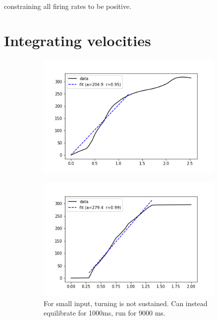 \documentclass{article}
\begin{document}
constraining all firing rates to be positive.



\section{Integrating velocities}


\begin{figure}[h]
	\centering
	\begin{subfigure}[t]{0.43\linewidth}
		\centering
		\includegraphics[width = 1.0\linewidth, trim={0 0 0 0}, clip=true]{../figures/testvels_early.png}
		\label{fig:F}	
	\end{subfigure}
	\hspace{0.1\linewidth}
	\begin{subfigure}[t]{0.43\linewidth}
		\centering
		\includegraphics[width = 1.0\linewidth, trim={0 0 0 0}, clip=true]{../figures/testvels_late.png}
		\caption{For small input, turning is not sustained. Can instead equilibrate for 1000ms, run for 9000 ms.}
		\label{fig:dF}
	\end{subfigure}
\caption{}
\label{fig:fit}
\end{figure}
\end{document}
